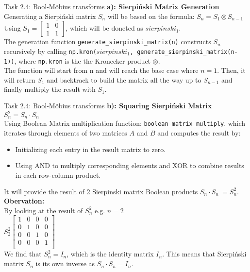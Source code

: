 \documentclass[aspectratio=169]{beamer}
\begin{document}
\begin{frame}{Task 2.4: Bool-Möbius transforms}
\textbf{a): Sierpiński Matrix Generation}\\
Generating a Sierpiński matrix \( S_n \) will be based on the formula: \( S_n = S_1 \otimes S_{n-1} \)\\
Using \( S_1 = \begin{bmatrix} 1 & 0 \\ 1 & 1 \end{bmatrix} \), which will be doneted as $sierpinski_1$.\\
The generation function \texttt{generate\_sierpinski\_matrix(n)} constructs \( S_n \) recursively by calling \texttt{np.kron($sierpinski_1$, generate\_sierpinski\_matrix(n-1))}, where \texttt{np.kron} is the the Kronecker product \( \otimes \).\\
The function will start from n and will reach the base case where $n = 1$. Then, it will return \( S_1\) and backtrack to build the matrix all the way up to \( S_{n-1}\) and finally multiply the result with \( S_1\).

\end{frame}

\begin{frame}{Task 2.4: Bool-Möbius transforms}
\textbf{b): Squaring Sierpiński Matrix \( S_n^2 = S_n \cdot S_n \)}\\
Using Boolean Matrix multiplication function: \texttt{boolean\_matrix\_multiply}, which iterates through elements of two matrices \( A \) and \( B \) and computes the result by:
\begin{itemize}
    \item Initializing each entry in the result matrix to zero.
    \item Using AND to multiply corresponding elements and XOR to combine results in each row-column product.
\end{itemize}
It will provide the result of 2 Sierpinski matrix Boolean products \(S_n \cdot S_n\ = S_n^2 \).\\
\textbf{Obervation: }\\
By looking at the result of \( S_n^2 \) e.g. $n=2$\\ \( S_2^2
\begin{bmatrix}
1 & 0 & 0 & 0 \\
0 & 1 & 0 & 0 \\
0 & 0 & 1 & 0 \\
0 & 0 & 0 & 1 \\
\end{bmatrix}
\)\\
We find that \( S_n^2 = I_n \), which is the identity matrix $I_n$. This means that Sierpiński matrix
$S_n$ is its own inverse as \(S_n \cdot S_n = I_n \).
\end{frame}
\end{document}
